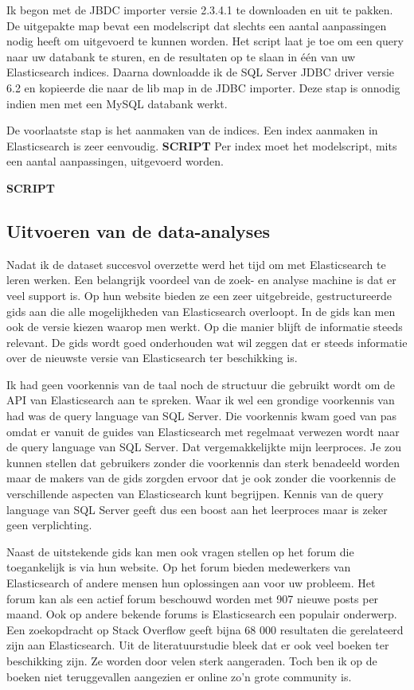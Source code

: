 Ik begon met de JBDC importer versie 2.3.4.1 te downloaden en uit te pakken. De uitgepakte map bevat een modelscript dat slechts een aantal aanpassingen nodig heeft om uitgevoerd te kunnen worden. Het script laat je toe om een query naar uw databank te sturen, en de resultaten op te slaan in één van uw Elasticsearch indices. Daarna downloadde ik de SQL Server JDBC driver versie 6.2 en kopieerde die naar de lib map in de JDBC importer. Deze stap is onnodig indien men met een MySQL databank werkt. 

De voorlaatste stap is het aanmaken van de indices. Een index aanmaken in Elasticsearch is zeer eenvoudig.\textbf{ SCRIPT}
Per index moet het modelscript, mits een aantal aanpassingen, uitgevoerd worden. 

\textbf{SCRIPT }

\subsection{Uitvoeren van de data-analyses}
Nadat ik de dataset succesvol overzette werd het tijd om met Elasticsearch te leren werken. Een belangrijk voordeel van de zoek- en analyse machine is dat er veel support is. Op hun website bieden ze een zeer uitgebreide, gestructureerde gids aan die alle mogelijkheden van Elasticsearch overloopt. In de gids kan men ook de versie kiezen waarop men werkt. Op die manier blijft de informatie steeds relevant. De gids wordt goed onderhouden wat wil zeggen dat er steeds informatie over de nieuwste versie van Elasticsearch ter beschikking is. 

Ik had geen voorkennis van de taal noch de structuur die gebruikt wordt om de API van Elasticsearch aan te spreken. Waar ik wel een grondige voorkennis van had was de query language van SQL Server. Die voorkennis kwam goed van pas omdat er vanuit de guides van Elasticsearch met regelmaat verwezen wordt naar de query language van SQL Server. Dat vergemakkelijkte mijn leerproces. Je zou kunnen stellen dat gebruikers zonder die voorkennis dan sterk benadeeld worden maar de makers van de gids zorgden ervoor dat je ook zonder die voorkennis de verschillende aspecten van Elasticsearch kunt begrijpen. Kennis van de query language van SQL Server geeft dus een boost aan het leerproces maar is zeker geen verplichting.

Naast de uitstekende gids kan men ook vragen stellen op het forum die toegankelijk is via hun website. Op het forum bieden medewerkers van Elasticsearch of andere mensen hun oplossingen aan voor uw probleem. Het forum kan als een actief forum beschouwd worden met 907 nieuwe posts per maand. Ook op andere bekende forums is Elasticsearch een populair onderwerp. Een zoekopdracht op Stack Overflow geeft bijna 68 000 resultaten die gerelateerd zijn aan Elasticsearch. Uit de literatuurstudie bleek dat er ook veel boeken ter beschikking zijn. Ze worden door velen sterk aangeraden. Toch ben ik op de boeken niet teruggevallen aangezien er online zo'n grote community is. 

